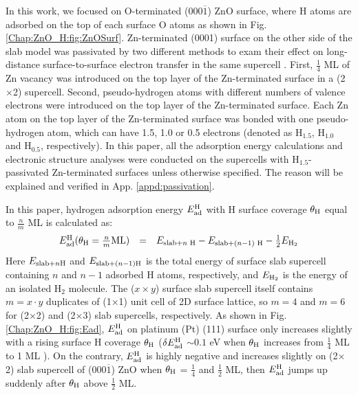 In this work, we focused on O-terminated (000$\overline{1}$) ZnO surface, where H atoms are adsorbed on the top of each surface O atoms as shown in Fig. \ref{Chap:ZnO_H:fig:ZnOSurf}. Zn-terminated (0001) surface on the other side of the slab model was passivated by two different methods to exam their effect on long-distance surface-to-surface electron transfer in the same supercell \cite{zhang2018tuning}. First, $\frac{1}{4}$ ML of Zn vacancy was introduced on the top layer of the Zn-terminated surface in a (2$\times$2) supercell. Second, pseudo-hydrogen atoms with different numbers of valence electrons were introduced on the top layer of the Zn-terminated surface. Each Zn atom on the top layer of the Zn-terminated surface was bonded with one pseudo-hydrogen atom, which can have 1.5, 1.0 or 0.5 electrons (denoted as H$_{1.5}$, H$_{1.0}$ and H$_{0.5}$, respectively). In this paper, all the adsorption energy calculations and electronic structure analyses were conducted on the supercells with H$_{1.5}$-passivated Zn-terminated surfaces unless otherwise specified. The reason will be explained and verified in App. \ref{appd:passivation}.

In this paper, hydrogen adsorption energy $E_{\textup{ad}}^{\textup{H}}$ with H surface coverage $\theta_{\textup{H}}$ equal to $\frac{n}{m}$ ML is calculated as:
\begin{equation}
  \begin{array}{rcl}
       E_{\textup{ad}}^{\textup{H}}(\theta_{\textup{H}}=\frac{n}{m} \textup{ML})&=&E_{\textup{slab+}n\textup{ H}}-E_{\textup{slab+}(n-1) \textup{ H}}-\frac{1}{2}E_{\textup{H}_{2}}
  \end{array}
  \label{eq1}
\end{equation}
Here $E_{\textup{slab+}n \textup{H}}$ and $E_{\textup{slab+}(n-1) \textup{H}}$ is the total energy of surface slab supercell containing $n$ and $n-1$ adsorbed H atoms, respectively, and $E_{\textup{H}_{2}}$ is the energy of an isolated H$_2$ molecule. The ($x\times y$) surface slab supercell itself contains $m=x\cdot y$ duplicates of (1$\times$1) unit cell of 2D surface lattice, so $m=4$ and $m=6$ for (2$\times$2) and (2$\times$3) slab supercells, respectively. As shown in Fig. \ref{Chap:ZnO_H:fig:Ead}, $E_{\textup{ad}}^{\textup{H}}$ on platinum (Pt) (111) surface only increases slightly with a rising surface H coverage $\theta_{\textup{H}}$ ($\delta E_{\textup{ad}}^{\textup{H}}$ $\sim0.1$ eV when  $\theta_{\textup{H}}$ increases from $\frac{1}{4}$ ML to 1 ML ). On the contrary, $E_{\textup{ad}}^{\textup{H}}$ is highly negative and increases slightly on (2$\times$2) slab supercell of (000$\overline{1}$) ZnO when  $\theta_{\textup{H}}$ = $\frac{1}{4}$ and $\frac{1}{2}$ ML, then $E_{\textup{ad}}^{\textup{H}}$ jumps up suddenly after $\theta_{\textup{H}}$ above $\frac{1}{2}$ ML. 

